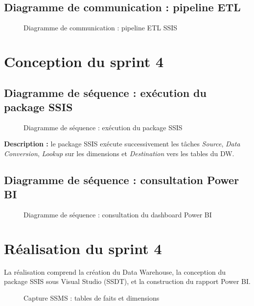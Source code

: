 \subsection{Diagramme de communication : pipeline ETL}
\begin{figure}[h!]
\centering
{}
\caption{Diagramme de communication : pipeline ETL SSIS}
\end{figure}

\section{Conception du sprint 4}

\subsection{Diagramme de séquence : exécution du package SSIS}
\begin{figure}[h!]
\centering
{}
\caption{Diagramme de séquence : exécution du package SSIS}
\end{figure}

\textbf{Description :} le package SSIS exécute successivement les tâches
\emph{Source}, \emph{Data Conversion}, \emph{Lookup} sur les dimensions et
\emph{Destination} vers les tables du DW.

\subsection{Diagramme de séquence : consultation Power BI}
\begin{figure}[h!]
\centering
{}
\caption{Diagramme de séquence : consultation du dashboard Power BI}
\end{figure}

\section{Réalisation du sprint 4}
La réalisation comprend la création du Data Warehouse, la conception du package SSIS
sous Visual Studio (SSDT), et la construction du rapport Power BI.

\begin{figure}[h!]
\centering
{}
\caption{Capture SSMS : tables de faits et dimensions}
\end{figure}

